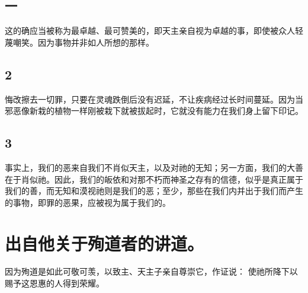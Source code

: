 
\subsection{一}

这的确应当被称为最卓越、最可赞美的，即天主亲自视为卓越的事，即使被众人轻蔑嘲笑。因为事物并非如人所想的那样。\par


\subsection{2}

悔改擦去一切罪，只要在灵魂跌倒后没有迟延，不让疾病经过长时间蔓延。因为当邪恶像新栽的植物一样刚被栽下就被拔起时，它就没有能力在我们身上留下印记。\par


\subsection{3}

事实上，我们的恶来自我们不肖似天主，以及对祂的无知；另一方面，我们的大善在于肖似祂。因此，我们的皈依和对那不朽而神圣之存有的信德，似乎是真正属于我们的善，而无知和漠视祂则是我们的恶；至少，那些在我们内并出于我们而产生的事物，即罪的恶果，应被视为属于我们的。\par


\section{出自他关于殉道者的讲道。}

因为殉道是如此可敬可羡，以致主、天主子亲自尊崇它，作证说：  使祂所降下以赐予这恩惠的人得到荣耀。\par

